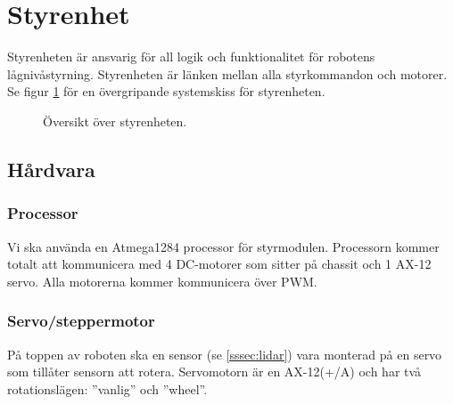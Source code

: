 \documentclass[a4paper,11pt]{article}
\begin{document}
\newpage
\section{Styrenhet} \label{sec:system2}
Styrenheten är ansvarig för all logik och funktionalitet för robotens lågnivåstyrning. Styrenheten är länken mellan alla styrkommandon och motorer. Se figur \ref{fig:unitMotorcontroller} för en övergripande systemskiss för styrenheten.

\begin{figure}[h!]
    \caption{Översikt över styrenheten.}
    \label{fig:unitMotorcontroller}
\end{figure}

\subsection{Hårdvara}

\subsubsection{Processor}
Vi ska använda en Atmega1284 processor för styrmodulen. Processorn kommer totalt att kommunicera med 4 DC-motorer som sitter på chassit och 1 AX-12 servo. Alla motorerna kommer kommunicera över PWM.

\subsubsection{Servo/steppermotor} \label{ssec:servomotor}
På toppen av roboten ska en sensor (se \ref{sssec:lidar}) vara monterad på en servo som tillåter sensorn att rotera. Servomotorn är en AX-12(+/A) och har två rotationslägen: ''vanlig'' och ''wheel''. 
\end{document}
